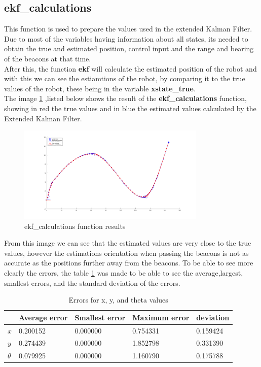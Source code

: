 \documentclass[runningheads]{llncs}
\begin{document}
\subsection*{ekf\_calculations}
This function is used to prepare the values used in the extended Kalman Filter. Due to most of the variables having information about all states, its needed to obtain the true and estimated position, control input and the range and bearing of the beacons at that time.\\
After this, the function \textbf{ekf} will calculate the estimated position of the robot and with this we can see the estiamtions of the robot, by comparing it to the true values of the robot, these being in the variable \textbf{xstate\_true}.
\\The image \ref*{ekf_calculations_fig} ,listed below shows the result of the \textbf{ekf\_calculations} function, showing in red the true values and in blue the estimated values calculated by the Extended Kalman Filter.

\begin{figure}
    \centering
    \includegraphics[width=0.8\textwidth]{ekf_calculationspng.png}
    \caption{ekf\_calculations function results}
    \label{ekf_calculations_fig}
\end{figure}


From this image we can see that the estimated values are very close to the true values,
however the estimations orientation when passing the beacons is not as accurate as the positions further away from the beacons.
To be able to see more clearly the errors, the table \ref{errors table}  was made to be able to see the average,largest, smallest errors, and the standard deviation of the errors.
\begin{table}[h]
    \centering
    \caption{Errors for x, y, and theta values}
    \label{errors table}
    \begin{tabular}{|l|l|l|l|l|}
    \hline
    & Average error & Smallest error & Maximum error & deviation \\ \hline
    $x$ & 0.200152 & 0.000000 & 0.754331  & 0.159424 \\ \hline
    $y$ & 0.274439 & 0.000000 & 1.852798 & 0.331390  \\ \hline
    $\theta$ & 0.079925 & 0.000000 & 1.160790 & 0.175788 \\\hline
    \end{tabular}
    \end{table}
\end{document}
